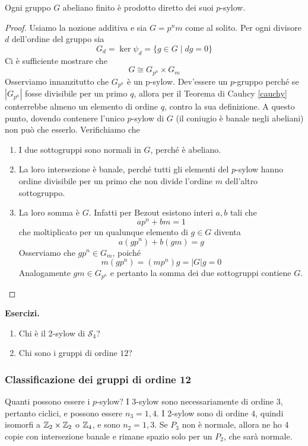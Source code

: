 \begin{multicols}{2}
\begin{theorem}
	Ogni gruppo $ G $ abeliano finito è prodotto diretto dei suoi $ p $-sylow.
\end{theorem}
\begin{proof}
	Usiamo la nozione additiva e sia $ G = p^nm $ come al solito. Per ogni divisore $ d$ dell'ordine del gruppo sia
	\[ G_d = \ker\psi_d = \{ g \in G \mid dg = 0 \} \]
	Ci è sufficiente mostrare che
	\[ G \cong G_{p^n} \times G_m \]
	Osserviamo innanzitutto che $ G_{p^n} $ è un p-sylow. Dev'essere un $ p $-gruppo perché se $ |G_{p^n}| $ fosse divisibile per un primo $ q $, allora per il Teorema di Cauhcy \ref{cauchy} conterrebbe almeno un elemento di ordine $ q $, contro la sua definizione. A questo punto, dovendo contenere l'unico $ p $-sylow di $ G $  (il coniugio è banale negli abeliani) non può che esserlo.
	Verifichiamo che
	\begin{enumerate}
		\item I due sottogruppi sono normali in $ G $, perché è abeliano.
		\item La loro intersezione è banale, perché tutti gli elementi del $ p $-sylow hanno ordine divisibile per un primo che non divide l'ordine $ m $ dell'altro sottogruppo.
		\item La loro somma è $ G $. Infatti per Bezout esistono interi $ a, b $ tali che
		\[ ap^n + bm = 1 \]
		che moltiplicato per un qualunque elemento di $ g \in G $ diventa
		\[ a(gp^n) + b(gm) = g \]
		Osserviamo che $ gp^n \in G_{m} $, poiché $$  m (gp^n) = (mp^n) g = |G| g = 0  $$
		Analogamente $ gm \in G_{p^n} $ e pertanto la somma dei due sottogruppi contiene $ G $.
	\end{enumerate}
\end{proof}

\textbf{Esercizi.}
\begin{enumerate}
	\item Chi è il 2-sylow di $ \mathcal{S}_4 $?
	\item Chi sono i gruppi di ordine $ 12 $?
\end{enumerate}
\bigskip
\subsubsection{Classificazione dei gruppi di ordine 12}

Quanti possono essere i $ p $-sylow?
I 3-sylow sono necessariamente di ordine $ 3 $, pertanto ciclici, e possono essere $ n_3 = 1, 4 $. I 2-sylow sono di ordine $ 4 $, quindi isomorfi a $ \mathbb{Z}_2 \times \mathbb{Z}_2 $ o $ \mathbb{Z}_4 $, e sono $ n_2 = 1, 3 $. Se $ P_3 $ non è normale, allora ne ho 4 copie con intersezione banale e rimane spazio solo per un $ P_2 $, che sarà normale.


\end{multicols}
